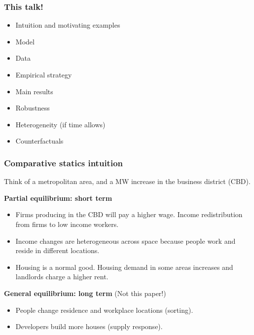 \documentclass[aspectratio=169]{beamer}
\begin{document}
\begin{frame}
	\frametitle{This talk!}
	
	\begin{itemize}
		\vspace{.5mm} \item Intuition and motivating examples
                 \vspace{.5mm} \item Model 
		\vspace{.5mm} \item Data
		\vspace{.5mm} \item 	Empirical strategy
		\vspace{.5mm} \item Main results 
		\vspace{.5mm} \item Robustness
		\vspace{.5mm} \item Heterogeneity (if time allows)
		\vspace{.5mm} \item Counterfactuals
	\end{itemize}
\end{frame}

\begin{frame}
	\frametitle{Comparative statics intuition}
    
    \vspace{3mm}
    
	Think of a metropolitan area, and a MW increase in the business district (CBD). 
	
	\vspace{3mm}
	
	\textbf{Partial equilibrium: short term}
	\begin{itemize}
		\vspace{.5mm} \item Firms producing in the CBD will pay a higher wage. Income redistribution 
		from firms to low income workers.
		\vspace{.5mm} \item Income changes are heterogeneous across space because people work 
		and reside in different locations.
		\vspace{.5mm} \item Housing is a normal good. Housing demand in some areas increases 
		and landlords charge a higher rent.
	\end{itemize}

	\pause
	\vspace{3mm}
	\textbf{General equilibrium: long term} (Not this paper!)
	\begin{itemize}
		\vspace{.5mm} \item People change residence and workplace locations (sorting).
		\vspace{.5mm} \item Developers build more houses (supply response).
	\end{itemize}
\end{frame}
\end{document}
